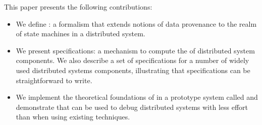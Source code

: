 This paper presents the following contributions:
\begin{itemize}
  \item
    We define \watprovenance{}: a formalism that extends notions of data
    provenance to the realm of state machines in a distributed system.
  \item
    We present \watprovenance{} specifications: a mechanism to compute the
    \watprovenance{} of distributed system components. We also describe a set
    of \watprovenance{} specifications for a number of widely used distributed
    systems components, illustrating that \watprovenance{} specifications can
    be straightforward to write.
  \item
    We implement the theoretical foundations of \watprovenance{} in a prototype
    system called \fluent{} and demonstrate that \fluent{} can be used to debug
    distributed systems with less effort than when using existing techniques.
\end{itemize}
